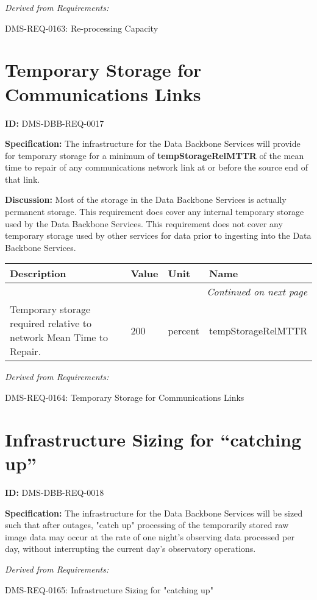 \documentclass[SE,toc,lsstdraft]{lsstdoc}
\makeatletter
\newcommand{\paramname}[1]{\hspace{0pt}#1}
\newcommand{\unitname}[1]{\hspace{0pt}#1}
\newenvironment{parameters}[0]{%
\setlength\LTleft{0pt}
\setlength\LTright{\fill}
\begin{small}
\begin{longtable}[]{|p{0.49\textwidth}|l|p{0.6in}|p{1.70in}@{}|}

\hline \textbf{Description} & \textbf{Value} & \textbf{Unit} & \textbf{Name} \\ \hline
\endhead

\hline \multicolumn{4}{r}{\emph{Continued on next page}} \\
\endfoot

\hline\hline
\endlastfoot
}{%
\hline
\end{longtable}
\end{small}
}
\makeatother
\begin{document}
\emph{Derived from Requirements:}

DMS-REQ-0163:
Re-processing Capacity \newline

\section{Temporary Storage for Communications Links}

\label{DMS-DBB-REQ-0017}
\textbf{ID:} DMS-DBB-REQ-0017

\textbf{Specification:}
The infrastructure for the Data Backbone Services will provide for temporary storage for a minimum of \textbf{tempStorageRelMTTR} of the mean time to repair of any communications network link at or before the source end of that link.

\textbf{Discussion:}
Most of the storage in the Data Backbone Services is actually permanent storage.    This requirement does cover any internal temporary storage used by the Data Backbone Services.   This requirement does not cover any temporary storage used by other services for data prior to ingesting into the Data Backbone Services.

\begin{parameters}
Temporary storage required relative to network Mean Time to Repair.
&
200
&
\unitname{%
percent
}
&
\paramname{%
tempStorageRelMTTR
} \\\hline
\end{parameters}

\emph{Derived from Requirements:}

DMS-REQ-0164:
Temporary Storage for Communications Links \newline

\section{Infrastructure Sizing for “catching up”}

\label{DMS-DBB-REQ-0018}
\textbf{ID:} DMS-DBB-REQ-0018

\textbf{Specification:}
The infrastructure for the Data Backbone Services will be sized such that after outages, "catch up" processing of the temporarily stored raw image data may occur at the rate of one night’s observing data processed per day, without interrupting the current day's observatory operations.

\emph{Derived from Requirements:}

DMS-REQ-0165:
Infrastructure Sizing for "catching up" \newline
\end{document}
